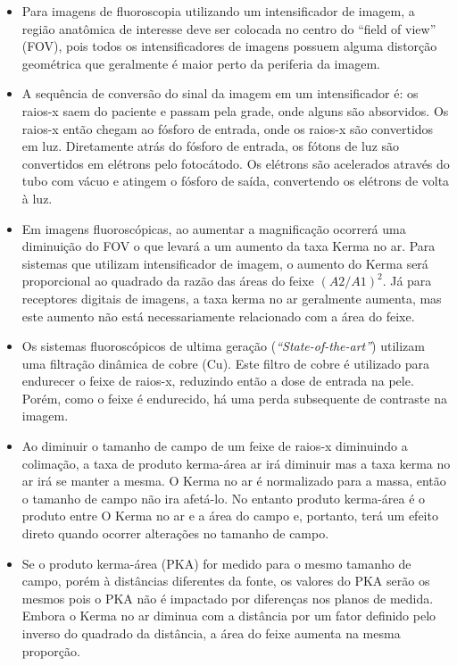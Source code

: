 \documentclass[11pt,a4paper]{article}
\newcounter{exemplo}
\begin{document}
\begin{exemplo}
\begin{itemize}
        \item Para imagens de fluoroscopia utilizando um intensificador de imagem, a região anatômica de interesse deve ser colocada no centro do ``field of view'' (FOV), pois todos os intensificadores de imagens possuem alguma distorção geométrica que geralmente é maior perto da periferia da imagem.
        
        \item A sequência de conversão do sinal da imagem em um intensificador é: os raios-x saem do paciente e passam pela grade, onde alguns são absorvidos. Os raios-x então chegam ao fósforo de entrada, onde os raios-x são convertidos em luz. Diretamente atrás do fósforo de entrada, os fótons de luz são convertidos em elétrons pelo fotocátodo. Os elétrons são acelerados através do tubo com vácuo e atingem o fósforo de saída, convertendo os elétrons de volta à luz.
        
        \item Em imagens fluoroscópicas, ao aumentar a magnificação ocorrerá uma diminuição do FOV o que levará a um aumento da taxa Kerma no ar. Para sistemas que utilizam intensificador de imagem, o aumento do Kerma será proporcional ao quadrado da razão das áreas do feixe $(A2/A1)^2$. Já para receptores digitais de imagens, a taxa kerma no ar geralmente aumenta, mas este aumento não está necessariamente relacionado com a área do feixe.
        
        \item Os sistemas fluoroscópicos de ultima geração (\textit{``State-of-the-art''}) utilizam uma filtração dinâmica de cobre (Cu). Este filtro de cobre é utilizado para endurecer o feixe de raios-x, reduzindo então a dose de entrada na pele. Porém, como o feixe é endurecido, há uma perda subsequente de contraste na imagem. 
        
        \item Ao diminuir o tamanho de campo de um feixe de raios-x diminuindo a colimação, a taxa de produto kerma-área ar irá diminuir mas a taxa kerma no ar irá se manter a mesma. O Kerma no ar é normalizado para a massa, então o tamanho de campo não ira afetá-lo. No entanto produto kerma-área é o produto entre O Kerma no ar e a área do campo e, portanto, terá um efeito direto quando ocorrer alterações no tamanho de campo.
        
        \item Se o produto kerma-área (PKA) for medido para o mesmo tamanho de campo, porém à distâncias diferentes da fonte, os valores do PKA serão os mesmos pois o PKA não é impactado por diferenças nos planos de medida. Embora o Kerma no ar diminua com a distância por um fator definido pelo inverso do quadrado da distância, a área do feixe aumenta na mesma proporção.
        

\end{itemize}
\end{exemplo}
\end{document}
